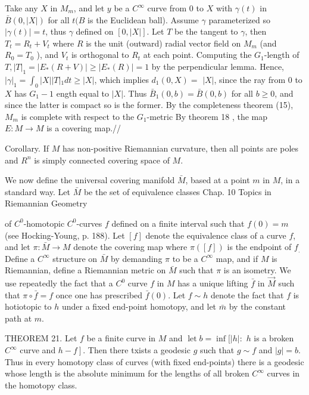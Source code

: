 \documentclass[10pt]{article}
\begin{document}
Take any $X$ in $M_{m}$, and let $y$ be a $C^{\infty}$ curve from 0 to $X$ with $\gamma(t)$ in $\bar{B}(0,|X|)$ for all $t(B$ is the Euclidean ball). Assume $\gamma$ parameterized so $|\gamma(t)|=t$, thus $\gamma$ defined on $[0,|X|]$. Let $T$ be the tangent to $\gamma$, then $T_{t}=R_{t}+V_{t}$ where $R$ is the unit (outward) radial vector field on $M_{m}$ (and $R_{0}=T_{0}$ ), and $V_{t}$ is orthogonal to $R_{t}$ at each point. Computing the $G_{1}$-length of $T,|T|_{1}=\left|E_{*}(R+V)\right| \geq\left|E_{*}(R)\right|=1$ by the perpendicular lemma. Hence, $|\gamma|_{1}=\int_{0}|X||T|{ }_{1} d t \geq|X|$, which implies $d_{1}(0, X)=$ $|X|$, since the ray from 0 to $X$ has $G_{1}-1$ ength equal to $|X|$. Thus $\bar{B}_{1}(0, b)=\bar{B}(0, b)$ for all $b \geq 0$, and since the latter is compact so is the former. By the completeness theorem (15), $M_{m}$ is complete with respect to the $G_{1}$-metric By theorem 18 , the map $E: M \rightarrow M$ is a covering map.//

Corollary. If $M$ has non-positive Riemannian curvature, then all points are poles and $R^{n}$ is simply connected covering space of $M$.

We now define the universal covering manifold $\bar{M}$, based at a point $m$ in $M$, in a standard way. Let $\bar{M}$ be the set of equivalence classes Chap. 10 Topics in Riemannian Geometry

of $C^{0}$-homotopic $C^{0}$-curves $f$ defined on a finite interval such that $f(0)=m$ (see Hocking-Young, p. 188). Let $[f]$ denote the equivalence class of a curve $f$, and let $\pi: \bar{M} \rightarrow M$ denote the covering map where $\pi([f])$ is the endpoint of $f_{.}$Define a $C^{\infty}$ structure on $\bar{M}$ by demanding $\pi$ to be a $C^{\infty}$ map, and if $M$ is Riemannian, define a Riemannian metric on $\bar{M}$ such that $\pi$ is an isometry. We use repeatedly the fact that a $C^{0}$ curve $f$ in $M$ has a unique lifting $\bar{f}$ in $\vec{M}$ such that $\pi \circ \bar{f}=f$ once one has prescribed $\bar{f}(0)$. Let $f \sim h$ denote the fact that $f$ is hotiotopic to $h$ under a fixed end-point homotopy, and let $\bar{m}$ by the constant path at $m .$

THEOREM 21. Let $f$ be a finite curve in $M$ and $\operatorname{let} b=\inf [|h|:$ $h$ is a broken $C^{\infty}$ curve and $\left.h-f\right]$. Then there txists a geodesic $g$ such that $g \sim f$ and $|g|=b$. Thus in every homotopy class of curves (with fixed end-points) there is a geodesic whose length is the absolute minimum for the lengths of all broken $C^{\infty}$ curves in the homotopy class.
\end{document}
